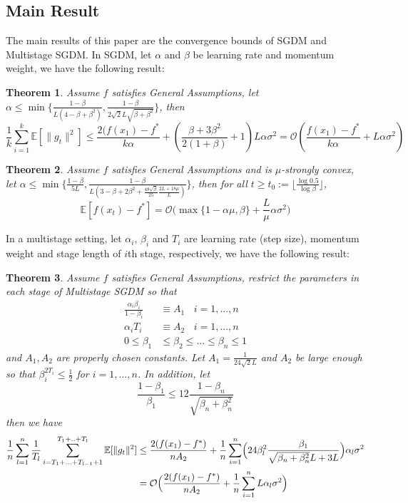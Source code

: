 \documentclass{article}
\newtheorem{theorem}{Theorem}[section]
\begin{document}
\subsection{Main Result}
The main results of this paper are the convergence bounds of SGDM and Multistage SGDM. In SGDM, let $\alpha$ and $\beta$ be learning rate and momentum weight, we have the following result:
\begin{theorem} Assume $f$ satisfies General Assumptions, let $\alpha \leq \min\{\frac{1 - \beta}{L(4 - \beta + \beta^2)}, \frac{1 - \beta}{2\sqrt{2}L\sqrt{\beta + \beta^2}}\}$, then
	\[
	\frac{1}{k}\sum_{i = 1}^{k}\mathbb{E}[\|g_t\|^2] \leq \frac{2 (f(x_1) - f^*}{k\alpha} + (\frac{\beta + 3\beta^2}{2 (1 + \beta)} + 1)L\alpha\sigma^2 = \mathcal{O}(\frac{f(x_1) - f^*}{k\alpha} + L\alpha\sigma^2)
	\]
\end{theorem}
\begin{theorem} Assume $f$ satisfies General Assumptions and is $\mu$-strongly convex, let $\alpha \leq \min\{\frac{1 - \beta}{5L}, \frac{1 - \beta}{L(3 - \beta + 2\beta^2 + \frac{48\sqrt{\beta}}{25}\frac{2L + 18\mu}{L})}\}$, then for all $t \geq t_0:= \lfloor\frac{\log 0.5}{\log \beta}\rfloor$, 
	\[
	\mathbb{E}[f(x_t) - f^*] = \mathcal{O}\bigl(\max\{1 - \alpha\mu, \beta\} + \frac{L}{\mu}\alpha\sigma^2\bigr)
	\]
\end{theorem}
In a multistage setting, let $\alpha_i$, $\beta_i$ and $T_i$ are learning rate (step size), momentum weight and stage length of $i$th stage, respectively, we have the following result:
\begin{theorem} Assume $f$ satisfies General Assumptions, restrict the parameters in each stage of Multistage SGDM so that 
\begin{equation}
\begin{split}
\frac{\alpha_i\beta_i}{1 - \beta_i} &\equiv A_1 \ \ \ \ i = 1,...,n\\
\alpha_iT_i &\equiv A_2 \ \ \ \ i = 1,...,n\\
0 \leq \beta_1 &\leq \beta_2 \leq ... \leq \beta_n \leq 1
\end{split}
\end{equation}
and $A_1, A_2$ are properly chosen constants. Let $A_1 = \frac{1}{24\sqrt{2}L}$ and $A_2$ be large enough so that $\beta_i^{2T_i} \leq \frac{1}{2}$ for $i = 1,...,n$. In addition, let
\[
\frac{1 - \beta_1}{\beta_1} \leq 12 \frac{1 - \beta_n}{\sqrt{\beta_n + \beta_n^2}}
\] then we have
\[
\begin{split}
\frac{1}{n}\sum_{l = 1}^{n}\frac{1}{T_l}\sum_{i = T_1 + ... + T_{l - 1} + 1}^{T_1 + .. + T_l}\mathbb{E}[\|g_t\|^2] &\leq \frac{2(f(x_1) - f^*)}{nA_2} + \frac{1}{n}\sum_{i = 1}^n\Bigl(24\beta^2_l\frac{\beta_1}{\sqrt{\beta_n + \beta_n^2}L + 3L}\Bigr)\alpha_l\sigma^2\\
&= \mathcal{O}\Bigl(\frac{2(f(x_1) - f^*)}{nA_2} + \frac{1}{n}\sum_{i = 1}^nL\alpha_l\sigma^2\Bigr)
\end{split}
\]
\end{theorem}
\end{document}
